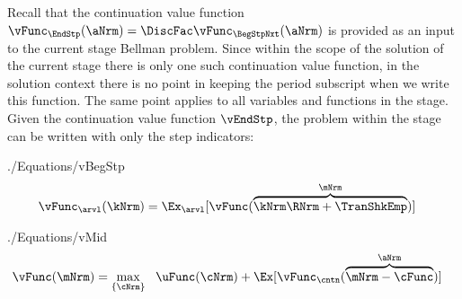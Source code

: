 \documentclass[\econtexRoot/SolvingMicroDSOPs]{subfiles}
\begin{document}
Recall that the continuation value function $\vFunc_{\EndStp}(\aNrm)=\DiscFac \vFunc_{\BegStpNxt}(\aNrm)$ is provided as an input to the current {stage} Bellman problem.  Since within the scope of the solution of the current {stage} there is only one such continuation value function, in the solution context there is no point in keeping the {period} subscript when we write this function.  The same point applies to all variables and functions in the {stage}.  Given the continuation value function $\vEndStp$, the problem within the {stage} can be written with only the {step} indicators:
\begin{verbatimwrite}{./Equations/vBegStp}
  \begin{equation}\begin{gathered}\begin{aligned}
        \vFunc_{\arvl}(\kNrm) & = \Ex_{\arvl}[\vFunc(\overbrace{\kNrm \RNrm + \TranShkEmp}^{\mNrm})]  \label{eq:vBegStp}
      \end{aligned}\end{gathered}\end{equation}
\end{verbatimwrite}
\unskip
\begin{verbatimwrite}{./Equations/vMid}
  \begin{equation}\begin{gathered}\begin{aligned}
        \vFunc(\mNrm) & = \max_{\{{\cNrm}\}}~~\uFunc({\cNrm}) +\Ex[ \vFunc_{\cntn}(\overbrace{\mNrm-\cFunc}^{\aNrm})] \label{eq:vMid}
      \end{aligned}\end{gathered}\end{equation}
\end{verbatimwrite}
\unskip
\end{document}
